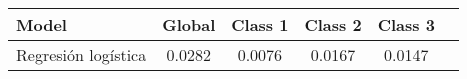 \begin{tabular}{p{3cm}|c|c|c|c|c}
\toprule
               Model &  Global &  Class 1 &  Class 2 &  Class 3 \\
\midrule
 Regresión logística &  0.0282 &   0.0076 &   0.0167 &   0.0147 \\
\bottomrule
\end{tabular}
